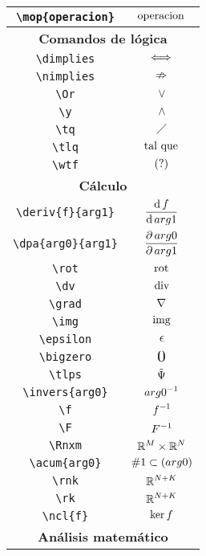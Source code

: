 \begin{longtable}{|c|c|}
 \hline\verb|\mop{operacion}| & $\displaystyle\mathrm{operacion}\,$ \\ \hline 
\multicolumn{2}{|c|}{\textbf{Comandos de lógica}} \\ \hline 
\verb|\dimplies| & $\displaystyle\iff$ \\ \hline 
\verb|\nimplies| & $\displaystyle\nRightarrow$ \\ \hline 
\verb|\Or| & $\displaystyle\vee$ \\ \hline 
\verb|\y| & $\displaystyle\wedge$ \\ \hline 
\verb|\tq| & $\displaystyle\;\diagup\;$ \\ \hline 
\verb|\tlq| & $\displaystyle\text{ tal que }$ \\ \hline 
\verb|\wtf| & $\displaystyle(?)$ \\ \hline 
\multicolumn{2}{|c|}{\textbf{Cálculo}} \\ \hline 
\verb|\deriv{f}{arg1}| & $\displaystyle\deriv{f}{arg1}$ \\ \hline 
\verb|\dpa{arg0}{arg1}| & $\displaystyle\frac{\partial\,arg0}{\partial\, arg1}$ \\ \hline 
\verb|\rot| & $\displaystyle\operatorname{rot}$ \\ \hline 
\verb|\dv| & $\displaystyle\operatorname{div}$ \\ \hline 
\verb|\grad| & $\displaystyle\nabla$ \\ \hline 
\verb|\img| & $\displaystyle\operatorname{img}$ \\ \hline 
\verb|\epsilon| & $\displaystyle\epsilon$ \\ \hline 
\verb|\bigzero| & $\displaystyle\text{\Large 0}$ \\ \hline 
\verb|\tlps| & $\displaystyle\tilde{\Psi}$ \\ \hline 
\verb|\invers{arg0}| & $\displaystyle arg0 ^ {-1}$ \\ \hline 
\verb|\f| & $\displaystyle f ^ {-1}$ \\ \hline 
\verb|\F| & $\displaystyle F ^ {-1}$ \\ \hline 
\verb|\Rnxm| & $\displaystyle\mathbb{R}^M\times\mathbb{R}^N$ \\ \hline 
\verb|\acum{arg0}| & $\displaystyle\acum{arg0}$ \\ \hline 
\verb|\rnk| & $\displaystyle\mathbb{R}^{N+K}$ \\ \hline 
\verb|\rk| & $\displaystyle\mathbb{R}^{N+K}$ \\ \hline 
\verb|\ncl{f}| & $\displaystyle\ker f$ \\ \hline 
\multicolumn{2}{|c|}{\textbf{Análisis matemático}} \\ \hline 

\end{longtable}
